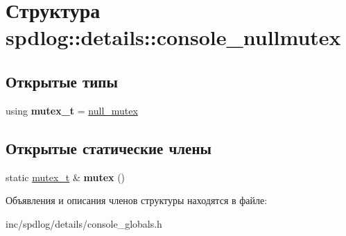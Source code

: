\hypertarget{structspdlog_1_1details_1_1console__nullmutex}{}\section{Структура spdlog\+:\+:details\+:\+:console\+\_\+nullmutex}
\label{structspdlog_1_1details_1_1console__nullmutex}
\subsection*{Открытые типы}
\begin{DoxyCompactItemize}
\item 
\mbox{\label{structspdlog_1_1details_1_1console__nullmutex_a8464e2d02b3800061339841b94400da5}} 
using {\bfseries mutex\+\_\+t} = \hyperlink{structspdlog_1_1details_1_1null__mutex}{null\+\_\+mutex}
\end{DoxyCompactItemize}
\subsection*{Открытые статические члены}
\begin{DoxyCompactItemize}
\item 
\mbox{\label{structspdlog_1_1details_1_1console__nullmutex_a61016e82a5c02f104e04b58c53f8c95d}} 
static \hyperlink{structspdlog_1_1details_1_1null__mutex}{mutex\+\_\+t} \& {\bfseries mutex} ()
\end{DoxyCompactItemize}


Объявления и описания членов структуры находятся в файле\+:\begin{DoxyCompactItemize}
\item 
inc/spdlog/details/console\+\_\+globals.\+h\end{DoxyCompactItemize}
